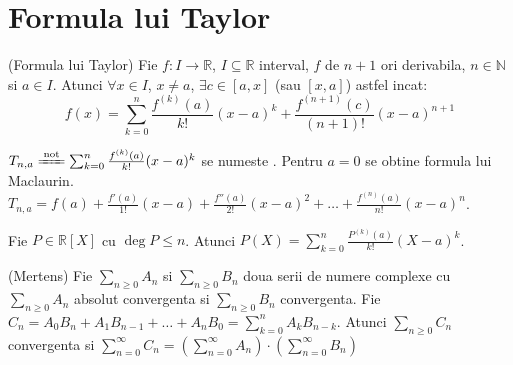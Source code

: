 \documentclass{article}
\begin{document}
\section{Formula lui Taylor}
\begin{enumerate}
\begin{tcolorbox}
  \teorema (Formula lui Taylor) Fie $f : I \to \mathbb{R}$, $I \subseteq \mathbb{R}$ interval, $f$ de $n+1$ ori derivabila, $n \in \mathbb{N}$ si $a \in I$. Atunci $\forall x \in I$, $x \neq a$, $\exists c \in [a, x]$ (sau $[x, a]$) astfel incat: 
  $$f(x) = \sum_{k = 0}^{n} \frac{f^{(k)}(a)}{k!} (x-a)^k + \frac{f^{(n+1)}(c)}{(n+1)!} (x-a)^{n+1}$$

  \notatie $T_{n, a} \xlongequal{\text{not}} \sum_{k = 0}^{n} \frac{f^{(k)}(a)}{k!} (x-a)^k$ se numeste .
  \observatie Pentru $a=0$ se obtine formula lui Maclaurin.
  \observatie $T_{n, a} = f(a) + \frac{f'(a)}{1!} (x-a) + \frac{f''(a)}{2!} (x-a)^2 + \dots + \frac{f^{(n)}(a)}{n!} (x-a)^n$.
\end{tcolorbox}
\corolar Fie $P \in \mathbb{R}[X]$ cu $\deg P \leq n$. Atunci $P(X) = \sum_{k = 0}^{n} \frac{P^{(k)}(a)}{k!} (X-a)^k$.

\teorema (Mertens) Fie $\sum_{n \geq 0} A_n$ si $\sum_{n \geq 0} B_n$ doua serii de numere complexe cu $\sum_{n \geq 0} A_n$ absolut convergenta si $\sum_{n \geq 0} B_n$ convergenta. Fie $C_n = A_0 B_n + A_1 B_{n-1} + \dots + A_n B_0 = \sum_{k=0}^{n} A_k B_{n-k}$. Atunci $\sum_{n \geq 0} C_n$ convergenta si $\sum_{n=0}^{\infty} C_n = \left( \sum_{n = 0}^{\infty} A_n \right) \cdot \left( \sum_{n = 0}^{\infty} B_n \right)$


\end{enumerate}
\end{document}
